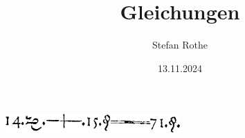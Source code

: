 \documentclass[parskip=half]{scrartcl}
\title{Gleichungen}
\author{Stefan Rothe}
\date{13.11.2024}
\begin{document}
  \maketitle
  \thispagestyle{firstpage}
  \begin{center}
    \vspace{5mm}

    \includegraphics[width=0.5\textwidth]{Erste Gleichung.png}
  \end{center}
  \tableofcontents
  \clearpage

  
  
  
  
  
\end{document}
